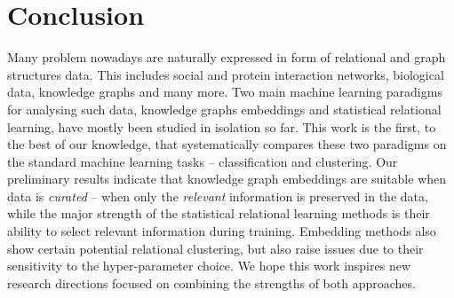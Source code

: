 \section{Conclusion}


Many problem nowadays are naturally expressed in form of relational and graph structures data.
This includes social and protein interaction networks, biological data, knowledge graphs and many more.
Two main machine learning paradigms for analysing such data, knowledge graphs embeddings and statistical relational learning, have mostly been studied in isolation so far.
This work is the first, to the best of our knowledge, that systematically compares these two paradigms on the standard machine learning tasks -- classification and clustering.
Our preliminary results indicate that knowledge graph embeddings are suitable when data is  \textit{curated} -- when only the \textit{relevant} information is preserved in the data, while the major strength of the statistical relational learning methods is their ability to select relevant information during training.
Embedding methods also show certain potential relational clustering, but also raise issues due to their sensitivity to the hyper-parameter choice.
We hope this work inspires new research directions focused on combining the strengths of both approaches.





\cleardoublepage


